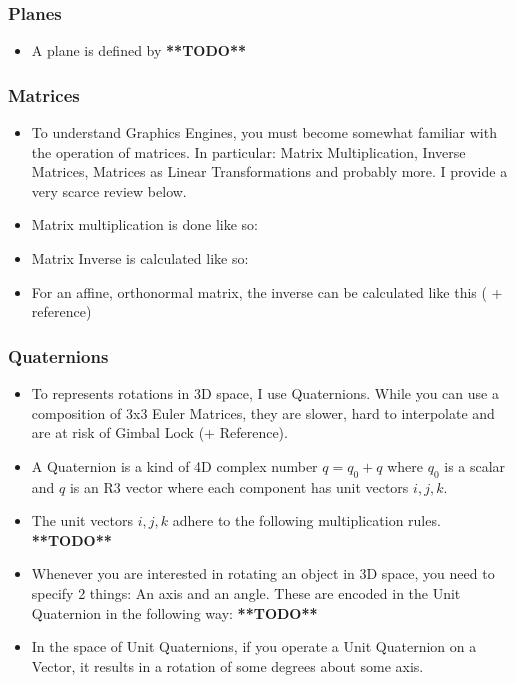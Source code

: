 \documentclass{article}
\begin{document}
\subsubsection{Planes}
\begin{itemize}
	\item A plane is defined by \textbf{**TODO**}
\end{itemize}
\subsubsection{Matrices}

\begin{itemize}
	\item To understand Graphics Engines, you must become somewhat familiar with the operation of matrices. In particular: Matrix Multiplication, Inverse Matrices, Matrices as Linear Transformations and probably more. I provide a very scarce review below.
	\item Matrix multiplication is done like so:
	\item Matrix Inverse is calculated like so:
	\item For an affine, orthonormal matrix, the inverse can be calculated like this ( + reference)
\end{itemize}
\subsubsection{Quaternions}
\begin{itemize}
	\item To represents rotations in 3D space, I use Quaternions. While you can use a composition of 3x3 Euler Matrices, they are slower, hard to interpolate and are at risk of Gimbal Lock (+ Reference).
	\item A Quaternion is a kind of 4D complex number $q = q_0 + q$ where $q_0$ is a scalar and
$q$ is an R3 vector where each component has unit vectors $i, j, k$.
	\item The unit vectors $i,j,k$ adhere to the following multiplication rules. \textbf{**TODO**}
	\item Whenever you are interested in rotating an object in 3D space, you need to specify 2 things: An axis and an angle. These are encoded in the Unit Quaternion in the following way: \textbf{**TODO**}
	\item In the space of Unit Quaternions, if you operate a Unit Quaternion on a Vector, it results in a rotation of some degrees about some axis.
\end{itemize}
\end{document}
